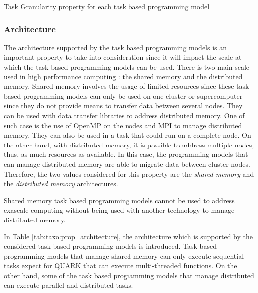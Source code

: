 \begin{table}[H]
	\caption{Task Granularity property for each task based programming model \label{tab:taxo:prop_task_granularity}}
	\centering
	\begin{multicols}{2}
		

		
	\end{multicols}
\end{table}

\subsubsection{Architecture}
The architecture supported by the task based programming models is an important property to take into consideration since it will impact the scale at which the task based programming models can be used.
There is two main scale used in high performance computing : the shared memory and the distributed memory.
Shared memory involves the usage of limited resources since these task based programming models can only be used on one cluster or supercomputer since they do not provide means to transfer data between several nodes.
They can be used with data transfer libraries to address distributed memory.
One of such case is the use of OpenMP on the nodes and MPI to manage distributed memory.
They can also be used in a task that could run on a complete node.
On the other hand, with distributed memory, it is possible to address multiple nodes, thus, as much resources as available.
In this case, the programming models that can manage distributed memory are able to migrate data between cluster nodes.
Therefore, the two values considered for this property are the \textit{shared memory} and the \textit{distributed memory} architectures.

Shared memory task based programming models cannot be used to address exascale computing without being used with another technology to manage distributed memory.

In Table \ref{tab:taxo:prop_architecture}, the architecture which is supported by the considered task based programming models is introduced.
Task based programming models that manage shared memory can only execute sequential tasks expect for QUARK that can execute multi-threaded functions.
On the other hand, some of the task based programming models that manage distributed can execute parallel and distributed tasks.

